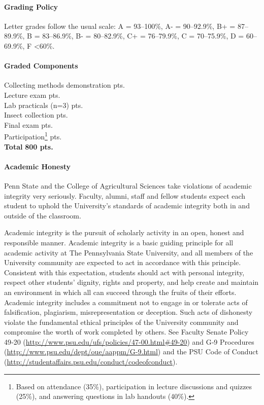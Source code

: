 \documentclass[11pt]{article}
\begin{document}
\paragraph{Grading Policy} Letter grades follow the usual scale: A = 93--100\%, A- = 90--92.9\%, B+ = 87--89.9\%, B = 83--86.9\%, B- = 80--82.9\%, C+ = 76--79.9\%, C = 70--75.9\%, D = 60--69.9\%, F \textless 60\%.

\paragraph{Graded Components}
\begin{center} \begin{minipage}{3.8in}
\begin{flushleft}
Collecting methods demonstration    pts.  \\
Lecture exam    pts.  \\
Lab practicals (n=3)    pts.  \\
Insect collection     pts.  \\
Final exam    pts.  \\
Participation\footnote{Based on attendance (35\%), participation in lecture discussions and quizzes (25\%), and answering questions in lab handouts (40\%).}     pts.  \\
\textbf{Total}   \dotfill \textbf{800 pts.} 
\end{flushleft}
\end{minipage}
\end{center}


\paragraph{Academic Honesty} Penn State and the College of Agricultural Sciences take violations of academic integrity very seriously. Faculty, alumni, staff and fellow students expect each student to uphold the University’s standards of academic integrity both in and outside of the classroom.

Academic integrity is the pursuit of scholarly activity in an open, honest and responsible manner. Academic integrity is a basic guiding principle for all academic activity at The Pennsylvania State University, and all members of the University community are expected to act in accordance with this principle. Consistent with this expectation, students should act with personal integrity, respect other students' dignity, rights and property, and help create and maintain an environment in which all can succeed through the fruits of their efforts. Academic integrity includes a commitment not to engage in or tolerate acts of falsification, plagiarism, misrepresentation or deception. Such acts of dishonesty violate the fundamental ethical principles of the University community and compromise the worth of work completed by others. See Faculty Senate Policy 49‐20 (\url{http://www.psu.edu/ufs/policies/47-00.html#49-20}) and G‐9 Procedures (\url{http://www.psu.edu/dept/oue/aappm/G-9.html}) and the PSU Code of Conduct (\url{http://studentaffairs.psu.edu/conduct/codeofconduct}).
\end{document}
